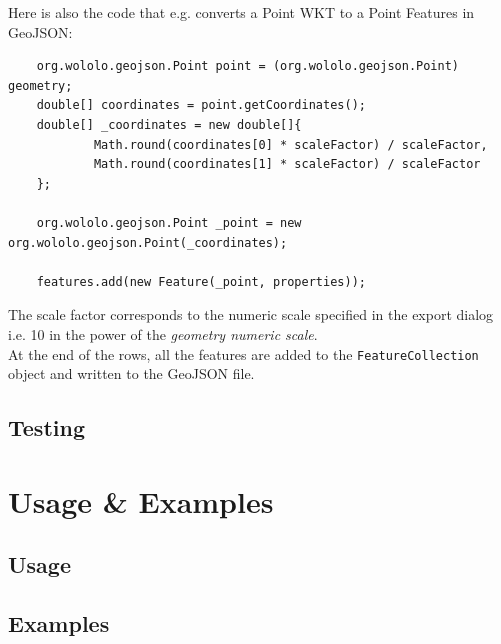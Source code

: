 Here is also the code that e.g. converts a Point WKT to a Point Features in GeoJSON:
\begin{verbatim}
    org.wololo.geojson.Point point = (org.wololo.geojson.Point) geometry;
    double[] coordinates = point.getCoordinates();
    double[] _coordinates = new double[]{
            Math.round(coordinates[0] * scaleFactor) / scaleFactor,
            Math.round(coordinates[1] * scaleFactor) / scaleFactor
    };

    org.wololo.geojson.Point _point = new org.wololo.geojson.Point(_coordinates);

    features.add(new Feature(_point, properties));
\end{verbatim}
The scale factor corresponds to the numeric scale specified in the export dialog i.e. 10 in the power of the \textit{geometry numeric scale}.\\
\newline
At the end of the rows, all the features are added to the \texttt{FeatureCollection} object and written to the GeoJSON file.
\subsection{Testing}
\lipsum[18-20]

\pagebreak
\section{Usage \& Examples}
\lipsum[9-10]
\subsection{Usage}
\lipsum[18-20]
\subsection{Examples}
\lipsum[3-4]